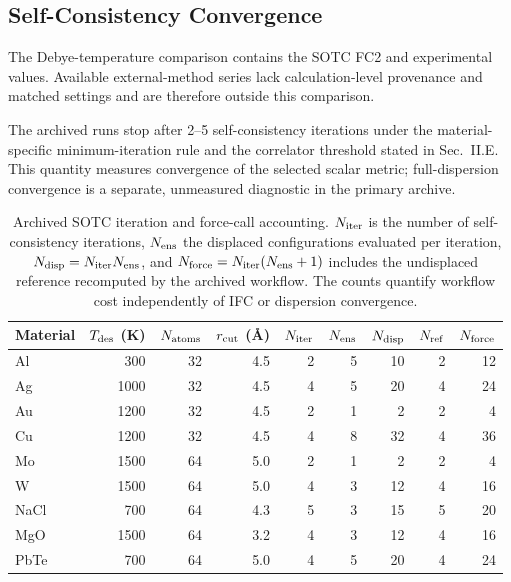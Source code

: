 \documentclass[aps,prb,reprint,amsmath,amssymb,floatfix]{revtex4-2}
\begin{document}
\subsection{Self-Consistency
Convergence}\label{self-consistency-convergence}

The Debye-temperature comparison contains the SOTC FC2 and experimental values.
Available external-method series lack calculation-level provenance and matched
settings and are therefore outside this comparison.

The archived runs stop after 2--5 self-consistency iterations under the
material-specific minimum-iteration rule and the correlator threshold stated in
Sec.~II.E. This quantity measures convergence of the selected scalar metric;
full-dispersion convergence is a separate, unmeasured diagnostic in the primary
archive.

\begin{table}[htbp]

\caption{Archived SOTC iteration and force-call accounting.
\(N_{\rm iter}\) is the number of self-consistency iterations,
\(N_{\rm ens}\) the displaced configurations evaluated per iteration,
\(N_{\rm disp}=N_{\rm iter}N_{\rm ens}\), and
\(N_{\rm force}=N_{\rm iter}(N_{\rm ens}+1)\) includes the undisplaced
reference recomputed by the archived workflow. The counts quantify workflow
cost independently of IFC or dispersion convergence.}
\begin{ruledtabular}
\begin{tabular}{lrrrrrrrr}
Material & \(T_{\rm des}\) (K) & \(N_{\rm atoms}\) & \(r_{\rm cut}\) (Å) &
\(N_{\rm iter}\) & \(N_{\rm ens}\) & \(N_{\rm disp}\) &
\(N_{\rm ref}\) & \(N_{\rm force}\) \\
\hline
Al   & 300  & 32 & 4.5 & 2 & 5 & 10 & 2 & 12 \\
Ag   & 1000 & 32 & 4.5 & 4 & 5 & 20 & 4 & 24 \\
Au   & 1200 & 32 & 4.5 & 2 & 1 &  2 & 2 &  4 \\
Cu   & 1200 & 32 & 4.5 & 4 & 8 & 32 & 4 & 36 \\
Mo   & 1500 & 64 & 5.0 & 2 & 1 &  2 & 2 &  4 \\
W    & 1500 & 64 & 5.0 & 4 & 3 & 12 & 4 & 16 \\
NaCl & 700  & 64 & 4.3 & 5 & 3 & 15 & 5 & 20 \\
MgO  & 1500 & 64 & 3.2 & 4 & 3 & 12 & 4 & 16 \\
PbTe & 700  & 64 & 5.0 & 4 & 5 & 20 & 4 & 24 \\
\end{tabular}
\end{ruledtabular}
\label{tab:1}

\end{table}
\end{document}
